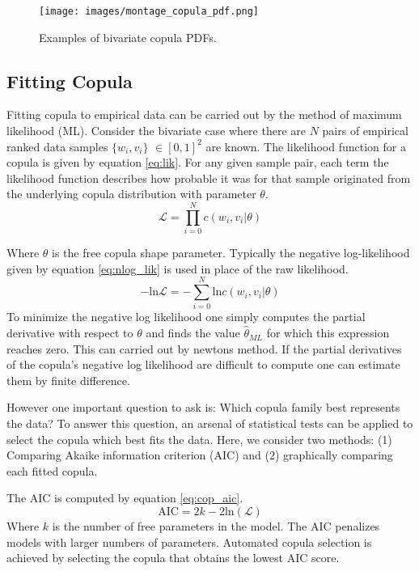 \begin{figure}[!htbp]
\centering
\texttt{[image: images/montage\_copula\_pdf.png]}
\caption{Examples of bivariate copula PDFs.}
\label{fig:montage_cop}
\end{figure}

\subsection*{Fitting Copula}

Fitting copula to empirical data can be carried out by the method of maximum likelihood (ML).  Consider the bivariate case where there are $N$ pairs of empirical ranked data samples $\{w_i, v_i\}$ $\in [0,1]^2$ are known. The likelihood function for a copula is given by equation \ref{eq:lik}.  For any given sample pair, each term the likelihood function describes how probable it was for that sample originated from the underlying copula distribution with parameter $\theta$.
\begin{equation}
\mathcal{L}= \prod_{i=0}^N c(w_i, v_i|\theta)
\label{eq:lik}
\end{equation}

Where $\theta$ is the free copula shape parameter.
Typically the negative log-likelihood given by equation \ref{eq:nlog_lik} is used in place of the raw likelihood.  
\begin{equation}
-\mathrm{ln}\mathcal{L}= -\sum_{i=0}^N \mathrm{ln} c(w_i, v_i|\theta)
\label{eq:nlog_lik}
\end{equation}
To minimize the negative log likelihood one simply computes the partial derivative with respect to $\theta$ and finds the value $\hat \theta_{ML}$ for which this expression reaches zero.  This can carried out by newtons method.  If the partial derivatives of the copula's negative log likelihood are difficult to compute one can estimate them by finite difference. 

However one important question to ask is: Which copula family best represents the data?  To answer this question, an arsenal of statistical tests can be applied to select the copula which best fits the data.  Here, we consider two methods:  (1) Comparing Akaike information criterion (AIC) and (2) graphically comparing each fitted copula.  

The AIC is computed by equation \ref{eq:cop_aic}.
\begin{equation}
\mathrm{AIC} = 2k - 2\mathrm{ln}(\mathcal{L})
\label{eq:cop_aic}
\end{equation}
Where $k$ is the number of free parameters in the model.  The AIC penalizes models with larger numbers of parameters. 
Automated copula selection is achieved by selecting the copula that obtains the lowest AIC score.

